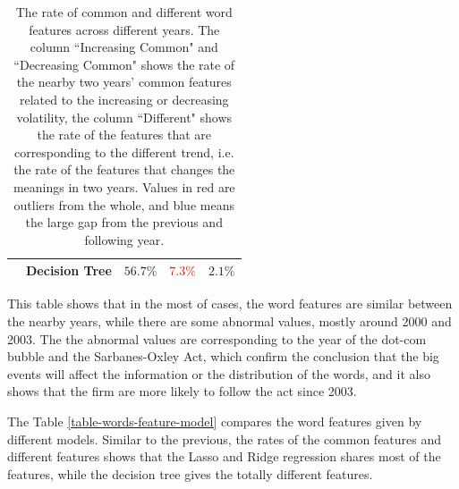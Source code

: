 \documentclass[11pt]{article}
\begin{document}
{\begin{table}[p]
\begin{tabular}{|c|c|c|c|c|}
      \cline{2-5}
                                 & Decision Tree & $56.7\%$                   & \textcolor{red}{$7.3\%$}   & $2.1\%$                     \\
      \hline
    \end{tabular}
    \caption{The rate of common and different word features across different years. The column ``Increasing Common" and ``Decreasing Common" shows the rate of the nearby two years' common features related to the increasing or decreasing volatility, the column ``Different" shows the rate of the features that are corresponding to the different trend, i.e. the rate of the features that changes the meanings in two years. Values in red are outliers from the whole, and blue means the large gap from the previous and following year.}
    \label{table-words-feature-year}
  \end{table}
  \clearpage
}

This table shows that in the most of cases, the word features are similar between the nearby years, while there are some abnormal values, mostly around 2000 and 2003. The the abnormal values are corresponding to the year of the dot-com bubble and the Sarbanes-Oxley Act, which confirm the conclusion that the big events will affect the information or the distribution of the words, and it also shows that the firm are more likely to follow the act since 2003.

The Table \ref{table-words-feature-model} compares the word features given by different models. Similar to the previous, the rates of the common features and different features shows that the Lasso and Ridge regression shares most of the features, while the decision tree gives the totally different features.
\end{document}
